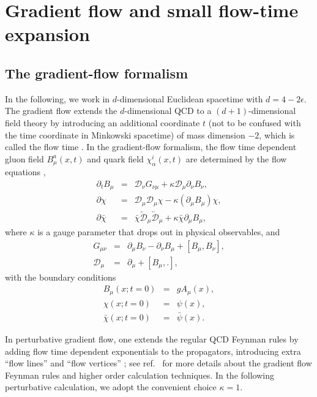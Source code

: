 \section{Gradient flow and small flow-time expansion}
\label{sec:introGF}
\subsection{The gradient-flow formalism}
In the following, we work in $d$-dimensional Euclidean spacetime with $d=4-2\epsilon$.
The gradient flow extends the $d$-dimensional QCD to a $(d+1)$-dimensional field theory by introducing an additional coordinate $t$ (not to be confused with the time coordinate in Minkowski spacetime) of mass dimension $-2$,  which is called the flow time \cite{Luscher:2010iy, Luscher:2011bx}. In the gradient-flow formalism, the flow time dependent gluon field $B_{\mu}^a(x, t)$ and quark field $\chi^i_{\alpha}(x, t)$ 
are determined by the flow equations \cite{Luscher:2010iy, Luscher:2011bx,Luscher:2013cpa},
\begin{eqnarray}
\label{eq:flowequations}
\partial_t B_{\mu} &=& \mathcal{D}_{\nu}G_{\nu\mu} +\kappa \mathcal{D}_{\mu}\partial_{\nu}B_{\nu},\\
\partial\chi &= & \mathcal{D}_{\mu}\mathcal{D}_{\mu}\chi -\kappa (\partial_{\mu}B_{\mu})\chi,\\
\partial\bar{\chi} &=& \bar{\chi}\overleftarrow{\mathcal{D}}_{\mu}\overleftarrow{\mathcal{D}}_{\mu} +\kappa\bar{\chi}\partial_{\mu}B_{\mu},
\end{eqnarray}
where  $\kappa$ is a gauge parameter that drops out in physical observables, and
\begin{eqnarray}
G_{\mu\nu} &= &\partial_{\mu}B_{\nu} -\partial_{\nu}B_{\mu} + \left[B_{\mu}, B_{\nu}\right],\\
\mathcal{D}_{\mu} &=&\partial_{\mu} + \left[B_{\mu}, .\right],
\end{eqnarray}
with the boundary conditions
\begin{eqnarray}
\label{eq:boundary}
B_{\mu}(x; t=0) &=& gA_{\mu}(x),\\
\chi(x; t=0) &=& \psi(x),\\
\bar{\chi}(x; t=0) &=& \bar{\psi}(x).
\end{eqnarray}


In perturbative gradient flow, one extends the regular QCD Feynman rules by adding flow time dependent exponentials to the propagators, introducing  extra ``flow lines” and ``flow vertices” \cite{Luscher:2011bx}; see ref.~\cite{Artz:2019bpr} for more details about the gradient flow Feynman rules and higher order calculation techniques. In the following perturbative calculation, we  adopt the  convenient choice $\kappa=1$.


